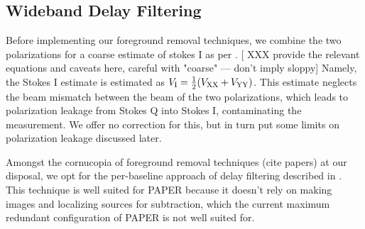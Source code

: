 \documentclass[twocolumn,numberedappendix]{emulateapj} \shorttitle{PSA64}
\begin{document}
%
%



\subsection{Wideband Delay Filtering}\label{sec:wbd_filtering}


Before implementing our foreground removal techniques, we combine the two
polarizations for a coarse estimate of stokes I as per \cite{moore_et_al2013}.
[ XXX provide the relevant equations and caveats here, careful with "coarse" --- don't imply sloppy]
Namely, the Stokes I estimate is estimated as $V_{\rm I} = \frac12(V_{\rm XX}+V_{\rm YY})$. This estimate
neglects the beam mismatch between the beam of the two polarizations, which
leads to polarization leakage from Stokes Q into Stokes I, contaminating the
measurement. We offer no correction for this, but in turn put some limits on
polarization leakage discussed later.

Amongst the cornucopia of foreground removal techniques (cite papers) at our
disposal, we opt for the per-baseline approach of delay filtering described in
\cite{parsons_et_al2012b}. This technique is well suited for PAPER because it
doesn't rely on making images and localizing sources for subtraction, which 
the current maximum redundant configuration of PAPER is not well suited for.
\end{document}
